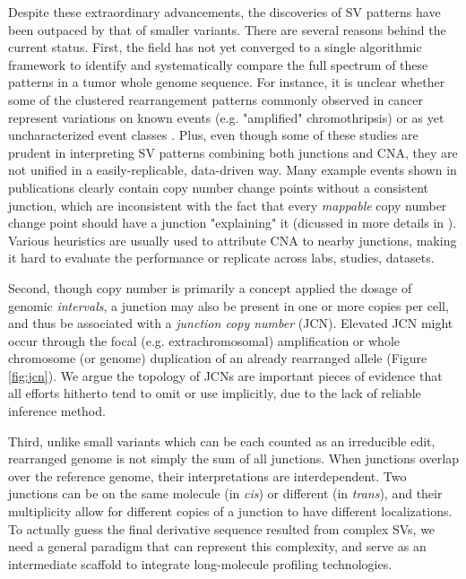 \documentclass[phd,tocprelim]{cornell}
\begin{document}
Despite these extraordinary advancements, the discoveries of SV patterns have been outpaced by that of smaller variants. There are several reasons behind the current status. First, the field has not yet converged to a single algorithmic framework to identify and systematically compare the full spectrum of these patterns in a tumor whole genome sequence. For instance, it is unclear whether some of the clustered rearrangement patterns commonly observed in cancer represent variations on known events (e.g. "amplified" chromothripsis) or as yet uncharacterized event classes \cite{pcawg_marker2020-yi, Li2020sv}. Plus, even though some of these studies are prudent in interpreting SV patterns combining both junctions and CNA, they are not unified in a easily-replicable, data-driven way. Many example events shown in publications clearly contain copy number change points without a consistent junction, which are inconsistent with the fact that every \textit{mappable} copy number change point should have a junction "explaining" it (dicussed in more details in \cite{Behr2021-gf}). Various heuristics are usually used to attribute CNA to nearby junctions, making it hard to evaluate the performance or replicate across labs, studies, datasets.

Second, though copy number is primarily a concept applied the dosage of genomic \textit{intervals}, a junction may also be present in one or more copies per cell, and thus be associated with a \textit{junction copy number} (JCN). Elevated JCN might occur through the focal (e.g. extrachromosomal) amplification \cite{Verhaak2019,Wu2019-ap} or whole chromosome (or genome) duplication of an already rearranged allele (Figure \ref{fig:jcn}). We argue the topology of JCNs are important pieces of evidence that all efforts hitherto tend to omit or use implicitly, due to the lack of reliable inference method.

Third, unlike small variants which can be each counted as an irreducible edit, rearranged genome is not simply the sum of all junctions. When junctions overlap over the reference genome, their interpretations are interdependent. Two junctions can be on the same molecule (in \textit{cis}) or different (in \textit{trans}), and their multiplicity allow for different copies of a junction to have different localizations. To actually guess the final derivative sequence resulted from complex SVs, we need a general paradigm that can represent this complexity, and serve as an intermediate scaffold to integrate long-molecule profiling technologies.
\end{document}
